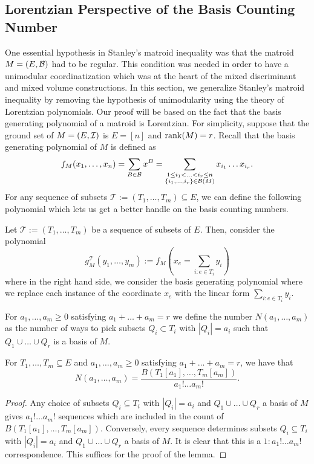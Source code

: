 \documentclass{puthesis-UG}
\begin{document}
\subsection{Lorentzian Perspective of the Basis Counting Number} \label{subsection-matroid-lorentzian-stanley-general}

One essential hypothesis in Stanley's matroid inequality was that the matroid $M = (E, \mathcal{B})$ had to be regular. This condition was needed in order to have a unimodular coordinatization which was at the heart of the mixed discriminant and mixed volume constructions. In this section, we generalize Stanley's matroid inequality by removing the hypothesis of unimodularity using the theory of Lorentzian polynomials. Our proof will be based on the fact that the basis generating polynomial of a matroid is Lorentzian. For simplicity, suppose that the ground set of $M = (E, \mathcal{I})$ is $E = [n]$ and $\operatorname{rank} (M) = r$. Recall that the basis generating polynomial of $M$ is defined as 
\[
	f_M(x_1, \ldots, x_n) = \sum_{B \in \mathcal{B}} x^B = \sum_{\substack{1 \leq i_1 < \ldots < i_r \leq n \\ \{i_1, \ldots, i_r\} \in \mathcal{B} (M)}} x_{i_1} \ldots x_{i_r}.
\]
For any sequence of subsets $\mathcal{T} := (T_1, \ldots, T_m) \subseteq E$, we can define the following polynomial which lets us get a better handle on the basis counting numbers. 

\begin{defn}
	Let $\mathcal{T} := (T_1, \ldots, T_m)$ be a sequence of subsets of $E$. Then, consider the polynomial 
	\[
		g_M^\mathcal{T} (y_1, \ldots, y_m) := f_M \left (x_e = \sum_{i : e \in T_i} y_i \right )
	\]
	where in the right hand side, we consider the basis generating polynomial where we replace each instance of the coordinate $x_e$ with the linear form $\sum_{i : e \in T_i} y_i$. 
\end{defn}

For $a_1, \ldots, a_m \geq 0$ satisfying $a_1 + \ldots + a_m = r$ we define the number $N(a_1, \ldots, a_m)$ as the number of ways to pick subsets $Q_i \subset T_i$ with $|Q_i| = a_i$ such that $Q_1 \cup \ldots \cup Q_r$ is a basis of $M$. 
\begin{lem} \label{lem-simplifying-N-to-B}
	For $T_1, \ldots, T_m \subseteq E$ and $a_1, \ldots, a_m \geq 0$ satisfying $a_1 + \ldots + a_m = r$, we have that 
	\[	
		N(a_1, \ldots, a_m) = \frac{B(T_1[a_1], \ldots, T_m[a_m])}{a_1! \ldots a_m!}.
	\]
\end{lem}

\begin{proof}
	Any choice of subsets $Q_i \subseteq T_i$ with $|Q_i| = a_i$ and $Q_1 \cup \ldots \cup Q_r$ a basis of $M$ gives $a_1! \ldots a_m!$ sequences which are included in the count of $B(T_1[a_1], \ldots, T_m[a_m])$. Conversely, every sequence determines subsets $Q_i \subseteq T_i$ with $|Q_i| = a_i$ and $Q_1 \cup \ldots \cup Q_r$ a basis of $M$. It is clear that this is a $1 : a_1! \ldots a_m!$ correspondence. This suffices for the proof of the lemma. 
\end{proof}
\end{document}
